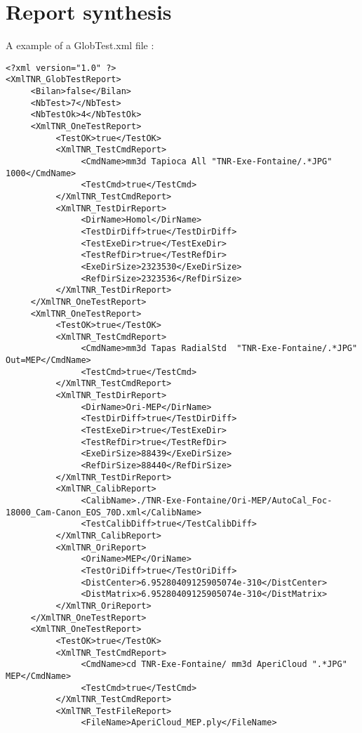 \documentclass[a4paper]{book}
\begin{document}
\section{Report synthesis}
A example of a GlobTest.xml file :
\begin{lstlisting}
<?xml version="1.0" ?>
<XmlTNR_GlobTestReport>
     <Bilan>false</Bilan>
     <NbTest>7</NbTest>
     <NbTestOk>4</NbTestOk>
     <XmlTNR_OneTestReport>
          <TestOK>true</TestOK>
          <XmlTNR_TestCmdReport>
               <CmdName>mm3d Tapioca All "TNR-Exe-Fontaine/.*JPG" 1000</CmdName>
               <TestCmd>true</TestCmd>
          </XmlTNR_TestCmdReport>
          <XmlTNR_TestDirReport>
               <DirName>Homol</DirName>
               <TestDirDiff>true</TestDirDiff>
               <TestExeDir>true</TestExeDir>
               <TestRefDir>true</TestRefDir>
               <ExeDirSize>2323530</ExeDirSize>
               <RefDirSize>2323536</RefDirSize>
          </XmlTNR_TestDirReport>
     </XmlTNR_OneTestReport>
     <XmlTNR_OneTestReport>
          <TestOK>true</TestOK>
          <XmlTNR_TestCmdReport>
               <CmdName>mm3d Tapas RadialStd  "TNR-Exe-Fontaine/.*JPG" Out=MEP</CmdName>
               <TestCmd>true</TestCmd>
          </XmlTNR_TestCmdReport>
          <XmlTNR_TestDirReport>
               <DirName>Ori-MEP</DirName>
               <TestDirDiff>true</TestDirDiff>
               <TestExeDir>true</TestExeDir>
               <TestRefDir>true</TestRefDir>
               <ExeDirSize>88439</ExeDirSize>
               <RefDirSize>88440</RefDirSize>
          </XmlTNR_TestDirReport>
          <XmlTNR_CalibReport>
               <CalibName>./TNR-Exe-Fontaine/Ori-MEP/AutoCal_Foc-18000_Cam-Canon_EOS_70D.xml</CalibName>
               <TestCalibDiff>true</TestCalibDiff>
          </XmlTNR_CalibReport>
          <XmlTNR_OriReport>
               <OriName>MEP</OriName>
               <TestOriDiff>true</TestOriDiff>
               <DistCenter>6.95280409125905074e-310</DistCenter>
               <DistMatrix>6.95280409125905074e-310</DistMatrix>
          </XmlTNR_OriReport>
     </XmlTNR_OneTestReport>
     <XmlTNR_OneTestReport>
          <TestOK>true</TestOK>
          <XmlTNR_TestCmdReport>
               <CmdName>cd TNR-Exe-Fontaine/ mm3d AperiCloud ".*JPG" MEP</CmdName>
               <TestCmd>true</TestCmd>
          </XmlTNR_TestCmdReport>
          <XmlTNR_TestFileReport>
               <FileName>AperiCloud_MEP.ply</FileName>

\end{lstlisting}
\end{document}
